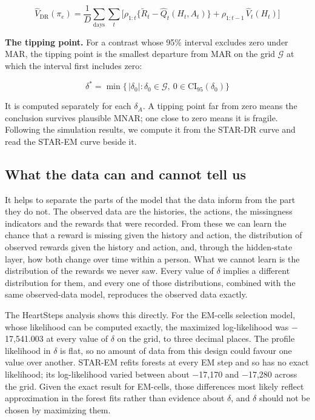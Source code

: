 \documentclass[12pt]{article}
\begin{document}
\begin{equation}\label{eq:dr}
\hat V_{\mathrm{DR}}(\pi_e)=\frac{1}{D}\sum_{\text{days}}\sum_t\Big[\rho_{1:t}\big\{\tilde R_t-\hat Q_t(H_t,A_t)\big\}+\rho_{1:t-1}\,\hat V_t(H_t)\Big]
\end{equation}

\textbf{The tipping point.} For a contrast whose 95\% interval excludes zero under MAR, the tipping point is the smallest departure from MAR on the grid $\mathcal{G}$ at which the interval first includes zero:

\begin{equation}\label{eq:tip}
\delta^{*}=\min\bigl\{\,|\delta_0| : \delta_0\in\mathcal{G},\ 0\in\mathrm{CI}_{95}(\delta_0)\bigr\}
\end{equation}

It is computed separately for each $\delta_A$. A tipping point far from zero means the conclusion survives plausible MNAR; one close to zero means it is fragile. Following the simulation results, we compute it from the STAR-DR curve and read the STAR-EM curve beside it.

\subsection{What the data can and cannot tell us}

It helps to separate the parts of the model that the data inform from the part they do not. The observed data are the histories, the actions, the missingness indicators and the rewards that were recorded. From these we can learn the chance that a reward is missing given the history and action, the distribution of observed rewards given the history and action, and, through the hidden-state layer, how both change over time within a person. What we cannot learn is the distribution of the rewards we never saw. Every value of $\delta$ implies a different distribution for them, and every one of those distributions, combined with the same observed-data model, reproduces the observed data exactly.

The HeartSteps analysis shows this directly. For the EM-cells selection model, whose likelihood can be computed exactly, the maximized log-likelihood was $-$17,541.003 at every value of $\delta$ on the grid, to three decimal places. The profile likelihood in $\delta$ is flat, so no amount of data from this design could favour one value over another. STAR-EM refits forests at every EM step and so has no exact likelihood; its log-likelihood varied between about $-$17,170 and $-$17,280 across the grid. Given the exact result for EM-cells, those differences most likely reflect approximation in the forest fits rather than evidence about $\delta$, and $\delta$ should not be chosen by maximizing them.
\end{document}
